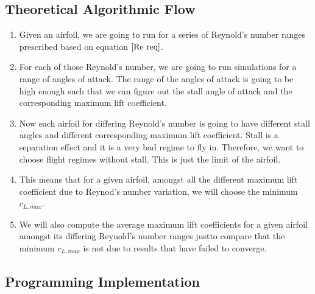 \subsection{Theoretical Algorithmic Flow}
\begin{comment}
\end{comment}
\begin{enumerate}
\item Given an airfoil, we are going to run for a series of Reynold's number ranges prescribed based on equation $\ref{Re req}$. 
\item For each of those Reynold's number, we are going to run simulations for a range of angles of attack. The range of the angles of attack is going to be high enough such that we can figure out the stall angle of attack and the corresponding maximum lift coefficient.
\item Now each airfoil for differing Reynold's number is going to have different stall angles and different corresponding maximum lift coefficient. Stall is a separation effect and it is a very bad regime to fly in. Therefore, we want to choose flight regimes without stall. This is just the limit of the airfoil.
\item This means that for a given airfoil, amongst all the different maximum lift coefficient due to Reynod's number variation, we will choose the minimum $c_{L,max}$.
\item We will also compute the average maximum lift coefficients for a given airfoil amongst its differing Reynold's number ranges justto compare that the minimum $c_{L,max}$ is not due to results that have failed to converge.
\end{enumerate}

\subsection{Programming Implementation}
\begin{comment}
\end{comment}







